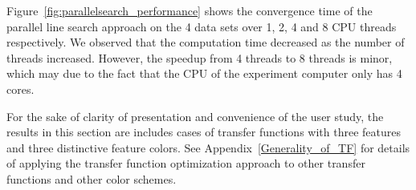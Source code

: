 Figure~\ref{fig:parallelsearch_performance} shows the convergence time of the parallel line search approach on the 4 data sets over 1, 2, 4 and 8 CPU threads respectively.
We observed that the computation time decreased as the number of threads increased. However, the speedup from 4 threads to 8 threads is minor, which may due to the fact that the CPU of the experiment computer only has 4 cores.

For the sake of clarity of presentation and convenience of the user study, the results in this section are includes cases of transfer functions with three features and three distinctive feature colors. See Appendix~\ref{Generality_of_TF} for details of applying the transfer function optimization approach to other transfer functions and other color schemes.


